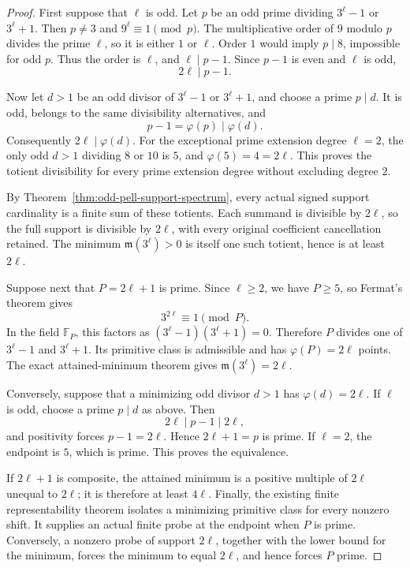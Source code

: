 \documentclass[11pt]{article}
\begin{document}
\begin{proof}
First suppose that \(\ell\) is odd. Let \(p\) be an odd prime
dividing \(3^\ell-1\) or \(3^\ell+1\).
Then \(p\ne3\) and \(9^\ell\equiv1\pmod p\).
The multiplicative order of \(9\) modulo \(p\) divides the prime
\(\ell\), so it is either \(1\) or \(\ell\).
Order \(1\) would imply \(p\mid8\), impossible for odd \(p\).
Thus the order is \(\ell\), and \(\ell\mid p-1\).
Since \(p-1\) is even and \(\ell\) is odd,
\[
                              2\ell\mid p-1.
\]

Now let \(d>1\) be an odd divisor of \(3^\ell-1\) or
\(3^\ell+1\), and choose a prime \(p\mid d\).
It is odd, belongs to the same divisibility alternatives, and
\[
                     p-1=\varphi(p)\mid\varphi(d).
\]
Consequently \(2\ell\mid\varphi(d)\).
For the exceptional prime extension degree \(\ell=2\), the
only odd \(d>1\) dividing \(8\) or \(10\) is \(5\), and
\(\varphi(5)=4=2\ell\). This proves the totient divisibility
for every prime extension degree without excluding degree \(2\).

By Theorem~\ref{thm:odd-pell-support-spectrum}, every actual
signed support cardinality is a finite sum of these totients.
Each summand is divisible by \(2\ell\), so the full support is
divisible by \(2\ell\), with every original coefficient
cancellation retained. The minimum \(\mathfrak m(3^\ell)>0\)
is itself one such totient, hence is at least \(2\ell\).

Suppose next that \(P=2\ell+1\) is prime. Since \(\ell\ge2\),
we have \(P\ge5\), so Fermat's theorem gives
\[
                         3^{2\ell}\equiv1\pmod P.
\]
In the field \(\mathbb F_P\), this factors as
\((3^\ell-1)(3^\ell+1)=0\). Therefore \(P\) divides one
of \(3^\ell-1\) and \(3^\ell+1\).
Its primitive class is admissible and has
\(\varphi(P)=2\ell\) points. The exact attained-minimum
theorem gives \(\mathfrak m(3^\ell)=2\ell\).

Conversely, suppose that a minimizing odd divisor \(d>1\)
has \(\varphi(d)=2\ell\). If \(\ell\) is odd, choose
a prime \(p\mid d\) as above. Then
\[
                          2\ell\mid p-1\mid2\ell,
\]
and positivity forces \(p-1=2\ell\).
Hence \(2\ell+1=p\) is prime.
If \(\ell=2\), the endpoint is \(5\), which is prime.
This proves the equivalence.

If \(2\ell+1\) is composite, the attained minimum is a
positive multiple of \(2\ell\) unequal to \(2\ell\);
it is therefore at least \(4\ell\).
Finally, the existing finite representability theorem isolates
a minimizing primitive class for every nonzero shift.
It supplies an actual finite probe at the endpoint when \(P\)
is prime. Conversely, a nonzero probe of support \(2\ell\),
together with the lower bound for the minimum, forces the
minimum to equal \(2\ell\), and hence forces \(P\) prime.
\end{proof}
\end{document}
